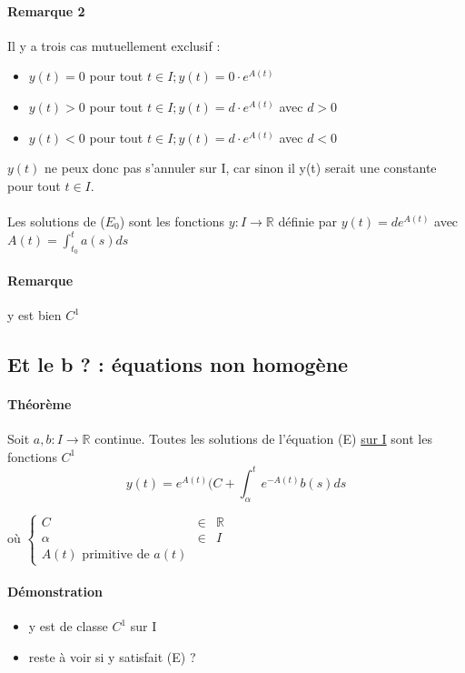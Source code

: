\paragraph{Remarque 2} Il y a trois cas mutuellement exclusif :
\begin{itemize}
	\item $y(t) = 0$ pour tout $t \in I; y(t) = 0\cdot e^{A(t)}$
	\item $y(t) > 0$ pour tout $t \in I; y(t) = d \cdot e^{A(t)}$ avec $d>0$
	\item $y(t) < 0$ pour tout $t \in I; y(t) = d \cdot e^{A(t)}$ avec $d<0$
\end{itemize}

$y(t)$ ne peux donc pas s'annuler sur I, car sinon il y(t) serait une constante pour tout $t \in I$.

\paragraph{} Les solutions de ($E_0$) sont les fonctions $y : I \rightarrow \mathbb{R}$ définie par $y(t) = de^{A(t)}$ avec $A(t) = \int_{t_0}^t a(s)ds$
\paragraph{Remarque} y est bien $C^1$

\subsection{Et le b ? : équations non homogène}

\paragraph{Théorème} Soit $a, b : I \rightarrow \mathbb{R}$ continue. Toutes les solutions de l'équation (E) \ul{sur I} sont les fonctions $C^1$ \[y(t) = e^{A(t)} (C + \int_\alpha^t e^{-A(t)} b(s)ds\]

où $\left\{\begin{array}{rcl}
	C &\in& \mathbb{R} \\
	\alpha &\in& I \\
	A(t) \text{ primitive de } a(t)\end{array}\right.$

	\paragraph{Démonstration} \begin{itemize}
		\item y est de classe $C^1$ sur I
\item reste à voir si y satisfait (E) ?\end{itemize}

